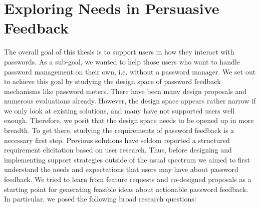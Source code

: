 \chapter[Exploring Needs in Persuasive Feedback] {Exploring Needs in Persuasive Feedback}\label{chap:feedback_modalities}




The overall goal of this thesis is to support users in how they interact with passwords. As a sub-goal, we wanted to help those users who want to handle password management on their own, i.e. without a password manager. We set out to achieve this goal by studying the design space of password feedback mechanisms like password meters. There have been many design proposals and numerous evaluations already. However, the design space appears rather narrow if we only look at existing solutions, and many have not supported users well enough. Therefore, we posit that the design space needs to be opened up in more breadth. To get there, studying the requirements of password feedback is a necessary first step. Previous solutions have seldom reported a structured requirement elicitation based on user research. Thus, before designing and implementing support strategies outside of the usual spectrum we aimed to first understand the needs and expectations that users may have about password feedback. We tried to learn from feature requests and co-designed proposals as a starting point for generating feasible ideas about actionable password feedback. In particular, we posed the following broad research questions:

